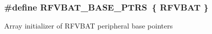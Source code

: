 \subsubsection[{\texorpdfstring{R\+F\+V\+B\+A\+T\+\_\+\+B\+A\+S\+E\+\_\+\+P\+T\+RS}{RFVBAT_BASE_PTRS}}]{\setlength{\rightskip}{0pt plus 5cm}\#define R\+F\+V\+B\+A\+T\+\_\+\+B\+A\+S\+E\+\_\+\+P\+T\+RS~\{ {\bf R\+F\+V\+B\+AT} \}}\hypertarget{group__RFVBAT__Peripheral__Access__Layer_gab0495e22a00c365211c3c8510feca9f2}{}\label{group__RFVBAT__Peripheral__Access__Layer_gab0495e22a00c365211c3c8510feca9f2}
Array initializer of R\+F\+V\+B\+AT peripheral base pointers 
